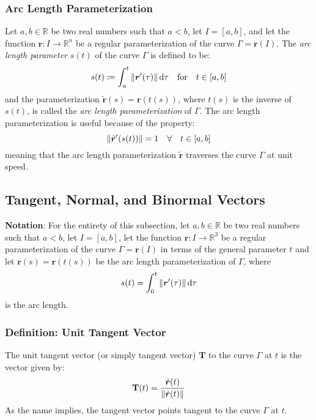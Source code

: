 \documentclass[11pt, a4paper]{article}
\newcommand{\diff}{\mathop{}\!\mathrm{d}} %
\begin{document}
\subsubsection{Arc Length Parameterization}
Let $ a, b \in \mathbb{R} $ be two real numbers such that $ a < b $, let $ I = [a, b] $, and let the function $ \bm{r} : I \rightarrow \mathbb{R}^n $ be a regular parameterization of the curve $ \Gamma = \bm{r}(I) $. The \textit{arc length parameter} $ s(t) $ of the curve $ \Gamma $ is defined to be:
\begin{equation*}
	s(t) \coloneqq \int_{a}^{t}\norm{\bm{r}'(\tau)} \diff \tau \quad \text{for} \quad t \in [a, b]
\end{equation*}
and the parameterization $ \tilde{\bm{r}}(s) = \bm{r}(t(s)) $, where $ t(s) $ is the inverse of $ s(t) $, is called the \textit{arc length parameterization} of $ \Gamma $. The arc length parameterization is useful because of the property:
\begin{equation*}
	\norm{\tilde{\bm{r}}'(s(t))} = 1 \quad \forall \quad t \in [a, b]
\end{equation*}
meaning that the arc length parameterization $ \tilde{\bm{r}} $ traverses the curve $ \Gamma $ at unit speed. 

\subsection{Tangent, Normal, and Binormal Vectors}

\textbf{Notation}:
For the entirety of this subsection, let $ a, b \in \mathbb{R} $ be two real numbers such that $ a < b $, let $ I = [a, b] $, let the function $ \bm{r} : I \rightarrow \mathbb{R}^3 $ be a regular parameterization of the curve $ \Gamma = \bm{r}(I) $ in terms of the general parameter $ t $ and let $ \bm{r}(s) = \bm{r}(t(s)) $ be the arc length parameterization of $ \Gamma $, where
\begin{equation*}
	s(t) = \int_{0}^{t} \norm{\bm{r}'(\tau)} \diff \tau
\end{equation*}
is the arc length.

\subsubsection{Definition: Unit Tangent Vector}
The unit tangent vector (or simply tangent vector) $ \mathbf{T} $ to the curve $ \Gamma $ at $ t $ is the vector given by:
\begin{equation*}
	\mathbf{T}(t) = \frac{\dot{\bm{r}}(t)}{\norm{\dot{\bm{r}}(t)}}
\end{equation*}
As the name implies, the tangent vector points tangent to the curve $ \Gamma $ at $ t $. 
\end{document}
